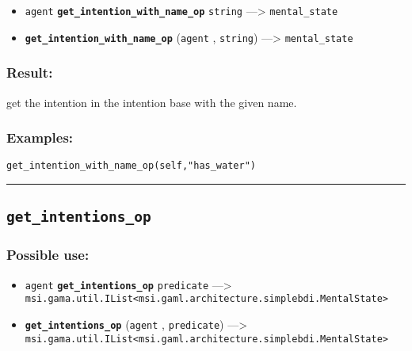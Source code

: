 \documentclass[]{book}
\providecommand{\tightlist}{%
  \setlength{\itemsep}{0pt}\setlength{\parskip}{0pt}}
\theoremstyle{definition}
\theoremstyle{definition}
\theoremstyle{definition}
\theoremstyle{remark}
\begin{document}
\begin{itemize}
\tightlist
\item
  \texttt{agent} \textbf{\texttt{get\_intention\_with\_name\_op}}
  \texttt{string} ---\textgreater{} \texttt{mental\_state}
\item
  \textbf{\texttt{get\_intention\_with\_name\_op}} (\texttt{agent} ,
  \texttt{string}) ---\textgreater{} \texttt{mental\_state}
\end{itemize}

\subsubsection{Result:}\label{result-209}

get the intention in the intention base with the given name.

\subsubsection{Examples:}\label{examples-162}

\begin{verbatim}
get_intention_with_name_op(self,"has_water") 
\end{verbatim}

\begin{center}\rule{0.5\linewidth}{\linethickness}\end{center}

\subsection{\texorpdfstring{\texttt{get\_intentions\_op}}{get\_intentions\_op}}\label{get_intentions_op}

\subsubsection{Possible use:}\label{possible-use-216}

\begin{itemize}
\tightlist
\item
  \texttt{agent} \textbf{\texttt{get\_intentions\_op}}
  \texttt{predicate} ---\textgreater{}
  \texttt{msi.gama.util.IList\textless{}msi.gaml.architecture.simplebdi.MentalState\textgreater{}}
\item
  \textbf{\texttt{get\_intentions\_op}} (\texttt{agent} ,
  \texttt{predicate}) ---\textgreater{}
  \texttt{msi.gama.util.IList\textless{}msi.gaml.architecture.simplebdi.MentalState\textgreater{}}
\end{itemize}
\end{document}
